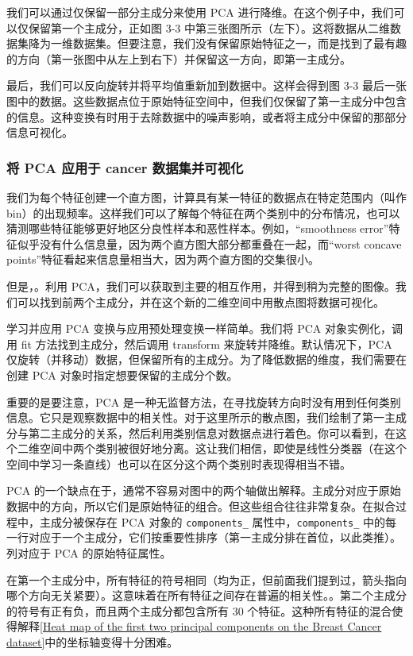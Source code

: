 我们可以通过仅保留一部分主成分来使用 PCA 进行降维。在这个例子中，我们可以仅保留第一个主成分，正如图 3-3 中第三张图所示（左下）。这将数据从二维数据集降为一维数据集。但要注意，我们没有保留原始特征之一，而是找到了最有趣的方向（第一张图中从左上到右下）并保留这一方向，即第一主成分。

最后，我们可以反向旋转并将平均值重新加到数据中。这样会得到图 3-3 最后一张图中的数据。这些数据点位于原始特征空间中，但我们仅保留了第一主成分中包含的信息。这种变换有时用于去除数据中的噪声影响，或者将主成分中保留的那部分信息可视化。

\subsubsection{将 PCA 应用于 cancer 数据集并可视化}
我们为每个特征创建一个直方图，计算具有某一特征的数据点在特定范围内（叫作bin）的出现频率。这样我们可以了解每个特征在两个类别中的分布情况，也可以猜测哪些特征能够更好地区分良性样本和恶性样本。例如，“smoothness error”特征似乎没有什么信息量，因为两个直方图大部分都重叠在一起，而“worst concave points”特征看起来信息量相当大，因为两个直方图的交集很小。

但是，。利用 PCA，我们可以获取到主要的相互作用，并得到稍为完整的图像。我们可以找到前两个主成分，并在这个新的二维空间中用散点图将数据可视化。

学习并应用 PCA 变换与应用预处理变换一样简单。我们将 PCA 对象实例化，调用 fit 方法找到主成分，然后调用 transform 来旋转并降维。默认情况下，PCA 仅旋转（并移动）数据，但保留所有的主成分。为了降低数据的维度，我们需要在创建 PCA 对象时指定想要保留的主成分个数。

重要的是要注意，PCA 是一种无监督方法，在寻找旋转方向时没有用到任何类别信息。它只是观察数据中的相关性。对于这里所示的散点图，我们绘制了第一主成分与第二主成分的关系，然后利用类别信息对数据点进行着色。你可以看到，在这个二维空间中两个类别被很好地分离。这让我们相信，即使是线性分类器（在这个空间中学习一条直线）也可以在区分这个两个类别时表现得相当不错。

PCA 的一个缺点在于，通常不容易对图中的两个轴做出解释。主成分对应于原始数据中的方向，所以它们是原始特征的组合。但这些组合往往非常复杂。在拟合过程中，主成分被保存在 PCA 对象的 \verb|components_| 属性中，\verb|components_| 中的每一行对应于一个主成分，它们按重要性排序（第一主成分排在首位，以此类推）。列对应于 PCA 的原始特征属性。


在第一个主成分中，所有特征的符号相同（均为正，但前面我们提到过，箭头指向哪个方向无关紧要）。这意味着在所有特征之间存在普遍的相关性。。第二个主成分的符号有正有负，而且两个主成分都包含所有 30 个特征。这种所有特征的混合使得解释\autoref{Heat map of the first two principal components on the Breast Cancer dataset}中的坐标轴变得十分困难。
